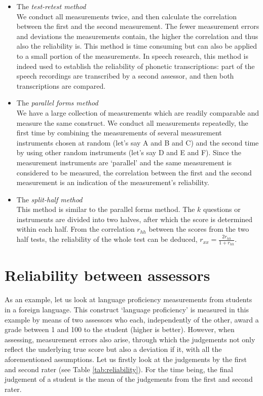 \documentclass[
]{book}
\begin{document}
\begin{itemize}
\item
  The \emph{test-retest method}\\
  We conduct all measurements twice, and then calculate the correlation
  between the first and the second measurement. The fewer measurement errors
  and deviations the measurements contain, the higher the correlation
  and thus also the reliability is. This method is
  time consuming but can also be applied to a small portion of the
  measurements. In speech research, this method is indeed used to establish
  the reliability of phonetic transcriptions: part of the speech
  recordings are transcribed by a second assessor, and then both transcriptions
  are compared.
\item
  The \emph{parallel forms method}\\
  We have a large collection of measurements which are readily
  comparable and measure the same construct. We conduct all
  measurements repeatedly, the first time by combining the measurements
  of several measurement instruments chosen at random (let's say A
  and B and C) and the second time by using other random
  instruments (let's say D and E and F). Since the measurement instruments are
  `parallel' and the same measurement is considered to be measured, the correlation
  between the first and the second measurement is an indication of the
  measurement's reliability.
\item
  The \emph{split-half method}\\
  This method is similar to the parallel forms method. The \(k\) questions
  or instruments are divided into two halves, after which the score
  is determined within each half. From the correlation \(r_{hh}\) between
  the scores from the two half tests, the reliability of the whole test can
  be deduced, \(r_{xx} = \frac{2r_{hh}}{1+r_{hh}}\).
\end{itemize}

\hypertarget{reliability-between-assessors}{%
\section{Reliability between assessors}\label{reliability-between-assessors}}

As an example, let us look at language proficiency measurements from students
in a foreign language. This construct `language proficiency'
is measured in this example by means of two assessors who each, independently
of the other, award a grade between 1 and 100 to the student (higher is better).
However, when assessing, measurement errors also arise, through which the judgements
not only reflect the underlying true score but also a deviation if it, with
all the aforementioned assumptions. Let us firstly look at the
judgements by the first and second rater (see Table
\ref{tab:reliability}). For the time being, the final judgement of a student is
the mean of the judgements from the first and second rater.
\end{document}
